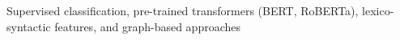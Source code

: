 Supervised classification, pre-trained transformers (BERT, RoBERTa), lexico-syntactic features, and graph-based approaches